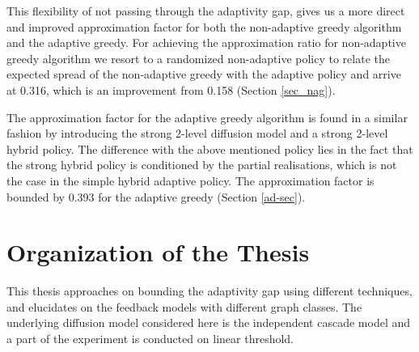 \begin{enumerate}
This flexibility of not passing through the adaptivity gap, gives us a more direct and improved approximation factor for both the non-adaptive greedy algorithm and the adaptive greedy. For achieving the approximation ratio for non-adaptive greedy algorithm we resort to a randomized non-adaptive policy to relate the expected spread of the non-adaptive greedy with the adaptive policy and arrive at 0.316, which is an improvement from 0.158 (Section \ref{sec_nag}).

The approximation factor for the adaptive greedy algorithm is found in a similar fashion by introducing the strong 2-level diffusion model and a strong 2-level hybrid policy. The difference with the above mentioned policy lies in the fact that the strong hybrid policy is conditioned by the partial realisations, which is not the case in the simple hybrid adaptive policy. The approximation factor is bounded by 0.393 for the adaptive greedy (Section \ref{ad-sec}).
\end{enumerate}

\section {Organization of the Thesis} \label{sec:org}
This thesis approaches on bounding the adaptivity gap using different techniques, and elucidates on the feedback models with different graph classes. The underlying diffusion model considered here is the independent cascade model and a part of the experiment is conducted on linear threshold.

